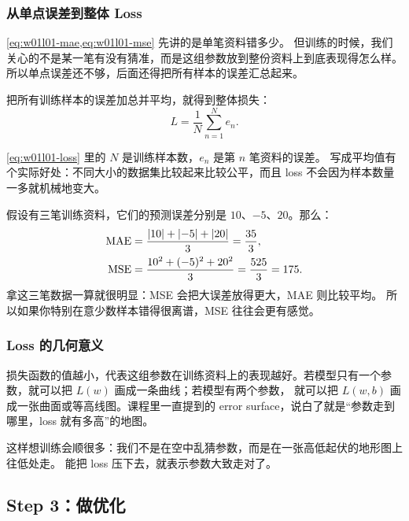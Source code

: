 \documentclass[main.tex]{subfiles}
\begin{document}
\subsubsection{从单点误差到整体 Loss}

\cref{eq:w01l01-mae,eq:w01l01-mse} 先讲的是单笔资料错多少。
但训练的时候，我们关心的不是某一笔有没有猜准，而是这组参数放到整份资料上到底表现得怎么样。
所以单点误差还不够，后面还得把所有样本的误差汇总起来。

把所有训练样本的误差加总并平均，就得到整体损失：
\begin{equation}
  L = \frac{1}{N}\sum_{n=1}^{N} e_n.
  \label{eq:w01l01-loss}
\end{equation}

\cref{eq:w01l01-loss} 里的 $N$ 是训练样本数，$e_n$ 是第 $n$ 笔资料的误差。
写成平均值有个实际好处：不同大小的数据集比较起来比较公平，而且 loss 不会因为样本数量一多就机械地变大。

\begin{examplebox}
假设有三笔训练资料，它们的预测误差分别是 $10$、$-5$、$20$。那么：
\begin{align*}
  \text{MAE} &= \frac{\left\lvert 10 \right\rvert + \left\lvert -5 \right\rvert + \left\lvert 20 \right\rvert}{3}
  = \frac{35}{3}, \\
  \text{MSE} &= \frac{10^2 + (-5)^2 + 20^2}{3}
  = \frac{525}{3} = 175.
\end{align*}
拿这三笔数据一算就很明显：MSE 会把大误差放得更大，MAE 则比较平均。
所以如果你特别在意少数样本错得很离谱，MSE 往往会更有感觉。
\end{examplebox}

\subsubsection{Loss 的几何意义}

\begin{intuitionbox}
损失函数的值越小，代表这组参数在训练资料上的表现越好。若模型只有一个参数，就可以把 $L(w)$ 画成一条曲线；若模型有两个参数，
就可以把 $L(w,b)$ 画成一张曲面或等高线图。课程里一直提到的 error surface，说白了就是“参数走到哪里，loss 就有多高”的地图。
\end{intuitionbox}

这样想训练会顺很多：我们不是在空中乱猜参数，而是在一张高低起伏的地形图上往低处走。
能把 loss 压下去，就表示参数大致走对了。

\subsection{Step 3：做优化}
\label{sec:w01l01-optimization}
\end{document}
